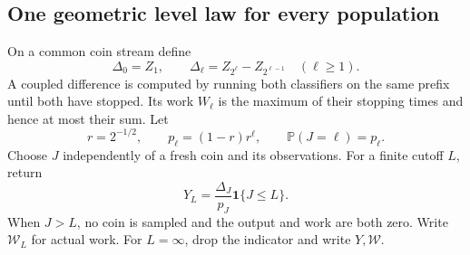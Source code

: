 \documentclass[11pt,a4paper]{article}
\theoremstyle{definition}
\newcommand{\Prob}{\mathbb P}
\newcommand{\ind}{\mathbf 1}
\begin{document}
\subsection{One geometric level law for every population}
On a common coin stream define
\begin{equation}\label{eq:deltas}
 \Delta_0=Z_1,\qquad \Delta_\ell=Z_{2^\ell}-Z_{2^{\ell-1}}
 \quad(\ell\ge1).
\end{equation}
A coupled difference is computed by running both classifiers on the same
prefix until both have stopped. Its work $W_\ell$ is the maximum of their
stopping times and hence at most their sum. Let
\begin{equation}\label{eq:p-level}
 r=2^{-1/2},\qquad p_\ell=(1-r)r^\ell,\qquad
 \Prob(J=\ell)=p_\ell.
\end{equation}
Choose $J$ independently of a fresh coin and its observations. For a finite
cutoff $L$, return
\begin{equation}\label{eq:Y-cut}
 Y_L=\frac{\Delta_J}{p_J}\ind\{J\le L\}.
\end{equation}
When $J>L$, no coin is sampled and the output and work are both zero.
Write $\mathcal W_L$ for actual work. For $L=\infty$, drop the indicator
and write $Y,\mathcal W$.
\end{document}
